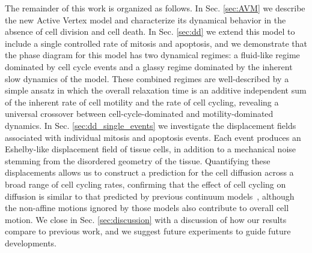 \documentclass[
reprint
,aps
,amssymb
,amsmath
,superscriptaddress
]{revtex4-1}
\newcommand{\mdc}[1]{{\color{blue}#1}}
\begin{document}
The remainder of this work is organized as follows. In Sec. \ref{sec:AVM} we describe the new Active Vertex model and characterize its dynamical behavior in the absence of cell division and cell death. In Sec. \ref{sec:dd} we extend this model to include a single controlled rate of mitosis and apoptosis, and we demonstrate that the phase diagram for this model has two dynamical regimes: a fluid-like regime dominated by cell cycle events and a glassy regime dominated by the inherent slow dynamics of the model. These combined regimes are well-described by a simple ansatz in which the overall relaxation time is an additive independent sum of the inherent rate of cell motility and the rate of cell cycling, revealing a universal crossover between cell-cycle-dominated and motility-dominated dynamics. In Sec. \ref{sec:dd_single_events} we investigate the displacement fields associated with individual mitosis and apoptosis events. Each event produces an Eshelby-like displacement field of tissue cells, in addition to a mechanical noise stemming from the disordered geometry of the tissue. Quantifying these displacements allows us to construct a prediction for the cell diffusion across a broad range of cell cycling rates, confirming that the effect of cell cycling on diffusion is similar to that predicted by previous continuum models~\cite{Matoz-Fernandez2017-1,Ranft2010}, although the non-affine motions ignored by those models also contribute to overall cell motion. We close in Sec. \ref{sec:discussion} with a discussion of how our results compare to previous work, and we suggest future experiments to guide future developments.






\end{document}
